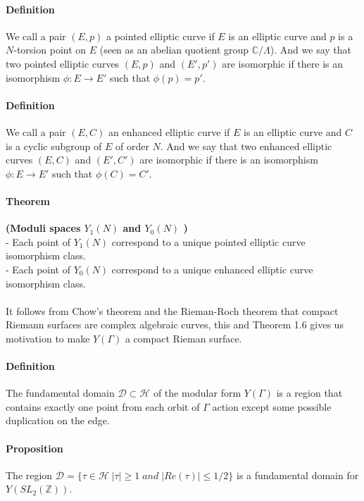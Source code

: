 \documentclass[letterpaper,10pt]{article}
\begin{document}
\paragraph{Definition } We call a pair $(E,p)$ a pointed elliptic curve if $E$ is an elliptic curve and $p$ is a $N$-torsion point on $E$ 
(seen as an abelian quotient group $\mathbb{C}/ \Lambda$). And we say that two pointed elliptic curves $(E,p)$ and $(E',p')$ are isomorphic if there is an isomorphism
$\phi: E\to E'$ such that $\phi(p) = p'$.

\paragraph{Definition } We call a pair $(E,C)$ an enhanced elliptic curve if $E$ is an elliptic curve and $C$ is a cyclic subgroup of $E$ of order $N$. 
And we say that two enhanced elliptic curves $(E,C)$ and $(E',C')$ are isomorphic if there is an isomorphism
$\phi: E\to E'$ such that $\phi(C) = C'$.

\paragraph{Theorem }\textbf{(Moduli spaces $Y_1(N)$ and $Y_0(N)$ )} \\- Each point of $Y_1(N)$ correspond to a unique pointed elliptic curve isomorphism class.\\
 - Each point of $Y_0(N)$ correspond to a unique enhanced elliptic curve isomorphism class.

 {\itshape \paragraph{} It follows from Chow's theorem and the Rieman-Roch theorem that compact Riemann surfaces are complex algebraic curves,
  this and Theorem 1.6 gives us motivation to make $Y(\Gamma) $ a compact Rieman surface. }


\paragraph{Definition } The fundamental domain $\mathcal{D} \subset \mathcal{H}$ of the modular form $Y(\Gamma)$ is
a region that contains exactly one point from each orbit of $\Gamma$ action except some
possible duplication on the edge.

\paragraph{Proposition} The region $\mathcal{D} = \{ \tau \in \mathcal{H}\;  |\tau| \geq 1 \; and \; |Re(\tau)| \leq 1/2\}$ is a fundamental domain for $Y(SL_2(\mathbb{Z}))$.
\end{document}
